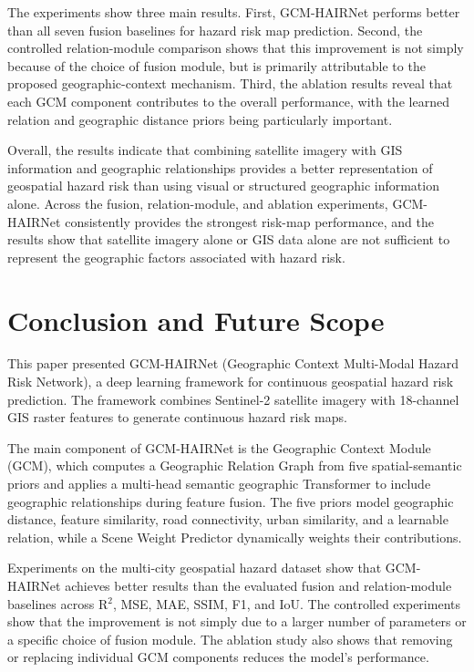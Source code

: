 \documentclass[sigconf, review=true]{acmart}
\begin{document}
The experiments show three main results. First, GCM-HAIRNet performs better than all seven fusion baselines for hazard risk map prediction. Second, the controlled relation-module comparison shows that this improvement is not simply because of the choice of fusion module, but is primarily attributable to the proposed geographic-context mechanism. Third, the ablation results reveal that each GCM component contributes to the overall performance, with the learned relation and geographic distance priors being particularly important.

Overall, the results indicate that combining satellite imagery with GIS information and geographic relationships provides a better representation of geospatial hazard risk than using visual or structured geographic information alone. Across the fusion, relation-module, and ablation experiments, GCM-HAIRNet consistently provides the strongest risk-map performance, and the results show that satellite imagery alone or GIS data alone are not sufficient to represent the geographic factors associated with hazard risk.

\section{Conclusion and Future Scope}

This paper presented GCM-HAIRNet (Geographic Context Multi-Modal Hazard Risk Network), a deep learning framework for continuous geospatial hazard risk prediction. The framework combines Sentinel-2 satellite imagery with 18-channel GIS raster features to generate continuous hazard risk maps.

The main component of GCM-HAIRNet is the Geographic Context Module (GCM), which computes a Geographic Relation Graph from five spatial-semantic priors and applies a multi-head semantic geographic Transformer to include geographic relationships during feature fusion. The five priors model geographic distance, feature similarity, road connectivity, urban similarity, and a learnable relation, while a Scene Weight Predictor dynamically weights their contributions.

Experiments on the multi-city geospatial hazard dataset show that GCM-HAIRNet achieves better results than the evaluated fusion and relation-module baselines across R$^2$, MSE, MAE, SSIM, F1, and IoU. The controlled experiments show that the improvement is not simply due to a larger number of parameters or a specific choice of fusion module. The ablation study also shows that removing or replacing individual GCM components reduces the model's performance.
\end{document}
